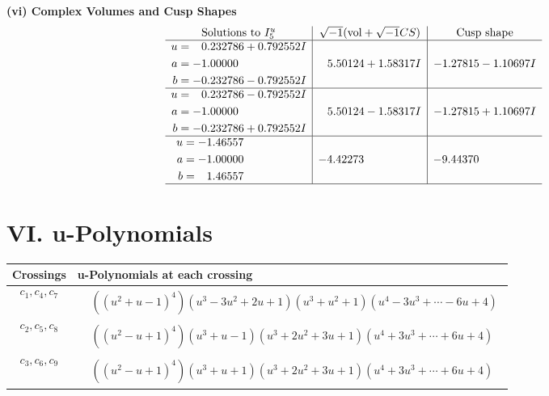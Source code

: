 \documentclass[1p]{elsarticle_modified}
\theoremstyle{definition}
\newcommand{\I}{\sqrt{-1}}
\begin{document}
\newpage\flushleft \textbf{(vi) Complex Volumes and Cusp Shapes}
$$\begin{array}{c|c|c}  
\text{Solutions to }I^u_{5}& \I (\text{vol} + \sqrt{-1}CS) & \text{Cusp shape}\\
 \hline 
\begin{aligned}
u &= \phantom{-}0.232786 + 0.792552 I \\
a &= -1.00000\phantom{ +0.000000I} \\
b &= -0.232786 - 0.792552 I\end{aligned}
 & \phantom{-}5.50124 + 1.58317 I & -1.27815 - 1.10697 I \\ \hline\begin{aligned}
u &= \phantom{-}0.232786 - 0.792552 I \\
a &= -1.00000\phantom{ +0.000000I} \\
b &= -0.232786 + 0.792552 I\end{aligned}
 & \phantom{-}5.50124 - 1.58317 I & -1.27815 + 1.10697 I \\ \hline\begin{aligned}
u &= -1.46557\phantom{ +0.000000I} \\
a &= -1.00000\phantom{ +0.000000I} \\
b &= \phantom{-}1.46557\phantom{ +0.000000I}\end{aligned}
 & -4.42273\phantom{ +0.000000I} & -9.44370\phantom{ +0.000000I}\\
 \hline 
 \end{array}$$\newpage
\newpage\renewcommand{\arraystretch}{1}
\centering \section*{ VI. u-Polynomials}
\begin{tabular}{m{50pt}|m{274pt}}
Crossings & \hspace{64pt}u-Polynomials at each crossing \\
\hline $$\begin{aligned}c_{1},c_{4},c_{7}\end{aligned}$$&$\begin{aligned}
&((u^2+u-1)^4)(u^{3}-3 u^{2}+2 u+1)(u^3+u^2+1)(u^{4}-3 u^{3}+\cdots-6 u+4)
\end{aligned}$\\
\hline $$\begin{aligned}c_{2},c_{5},c_{8}\end{aligned}$$&$\begin{aligned}
&((u^2- u+1)^4)(u^3+u-1)(u^{3}+2 u^{2}+3 u+1)(u^{4}+3 u^{3}+\cdots+6 u+4)
\end{aligned}$\\
\hline $$\begin{aligned}c_{3},c_{6},c_{9}\end{aligned}$$&$\begin{aligned}
&((u^2- u+1)^4)(u^3+u+1)(u^{3}+2 u^{2}+3 u+1)(u^{4}+3 u^{3}+\cdots+6 u+4)
\end{aligned}$\\
\hline
\end{tabular}\newpage\renewcommand{\arraystretch}{1}
\end{document}
